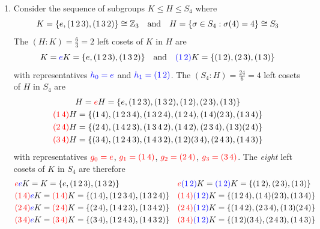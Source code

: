 \begin{examples}{}{}
\begin{enumerate}
		\item Consider the sequence of subgroups $K\le H\le S_4$ where
		\[
			K=\{e,(1\,2\,3),(1\,3\,2)\}\cong\mathbb{Z}_3
			\quad\text{and}\quad 
			H=\{\sigma\in S_4:\sigma(4)=4\}\cong S_3
		\]
		The $(H:K)=\frac 63=2$ left cosets of $K$ in $H$ are
		\[
			K=\textcolor{blue}{e}K=\{e,(1\,2\,3),(1\,3\,2)\}
			\quad\text{and}\quad 
			\textcolor{blue}{(1\,2)}K=\{(1\,2),(2\,3),(1\,3)\}
		\]
		with representatives $\textcolor{blue}{h_0=e}$ and $\textcolor{blue}{h_1=(1\,2)}$. The $(S_4:H)=\frac{24}6=4$ left cosets of $H$ in $S_4$ are
		\begin{gather*}
			H=\textcolor{red}{e}H=\{e,(1\,2\,3),(1\,3\,2),(1\,2),(2\,3),(1\,3)\}\\
			\textcolor{red}{(1\,4)}H=\{(1\,4),(1\,2\,3\,4),(1\,3\,2\,4),(1\,2\,4),(1\,4)(2\,3),(1\,3\,4)\}\\
			\textcolor{red}{(2\,4)}H=\{(2\,4),(1\,4\,2\,3),(1\,3\,4\,2),(1\,4\,2),(2\,3\,4),(1\,3)(2\,4)\}\\
			\textcolor{red}{(3\,4)}H=\{(3\,4),(1\,2\,4\,3),(1\,4\,3\,2),(1\,2)(3\,4),(2\,4\,3),(1\,4\,3)\}
		\end{gather*}
		with representatives $\textcolor{red}{g_0=e}$, $\textcolor{red}{g_1=(1\,4)}$, $\textcolor{red}{g_2=(2\,4)}$, $\textcolor{red}{g_3=(3\,4)}$. The \emph{eight} left cosets of $K$ in $S_4$ are therefore
		\begin{align*}
			&\textcolor{red}{e}\textcolor{blue}{e}K=K=\{e,(1\,2\,3),(1\,3\,2)\}&&\textcolor{red}{e}\textcolor{blue}{(1\,2)}K=\textcolor{blue}{(1\,2)}K=\{(1\,2),(2\,3),(1\,3)\}\\
			&\textcolor{red}{(1\,4)}\textcolor{blue}{e}K=\textcolor{red}{(1\,4)}K=\{(1\,4),(1\,2\,3\,4),(1\,3\,2\,4)\}&&\textcolor{red}{(1\,4)}\textcolor{blue}{(1\,2)}K=\{(1\,2\,4),(1\,4)(2\,3),(1\,3\,4)\}\\
			&\textcolor{red}{(2\,4)}\textcolor{blue}{e}K=\textcolor{red}{(2\,4)}K=\{(2\,4),(1\,4\,2\,3),(1\,3\,4\,2)\}&&\textcolor{red}{(2\,4)}\textcolor{blue}{(1\,2)}K=\{(1\,4\,2),(2\,3\,4),(1\,3)(2\,4)\}\\
			&\textcolor{red}{(3\,4)}\textcolor{blue}{e}K=\textcolor{red}{(3\,4)}K=\{(3\,4),(1\,2\,4\,3),(1\,4\,3\,2)\}&&\textcolor{red}{(3\,4)}\textcolor{blue}{(1\,2)}K=\{(1\,2)(3\,4),(2\,4\,3),(1\,4\,3)\}
		\end{align*}
	\end{enumerate}
\end{examples}


